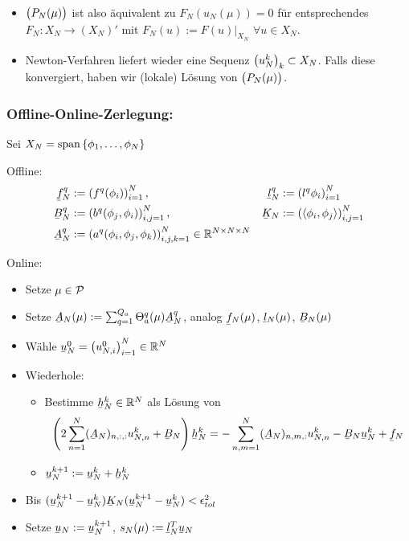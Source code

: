 \begin{bem} \beginwithlistbem
	\begin{itemize}
		\item $\big(P_N(\mu)\big)$ ist also äquivalent zu $F_N(u_N(\mu))=0$ für entsprechendes $F_N : X_N \to (X_N)'$ mit $F_N(u):=F(u)|_{X_N}$ $\forall u \in X_N$.
		\item Newton-Verfahren liefert wieder eine Sequenz $\left(u_N^k\right)_k \subset X_N$.
			Falls diese konvergiert, haben wir (lokale) Lösung von $\big(P_N(\mu)\big)$.
	\end{itemize}
\end{bem}

\subsubsection*{Offline-Online-Zerlegung:}
Sei $X_N = \spn\set{\phi_1,\ldots,\phi_N}$

Offline:
\begin{align*}
	\ubar f_N^q &:= \seq{f^q(\phi_i)}_{i=1}^N, & \ubar l_N^q &:= \seq{l^q{\phi_i}}_{i=1}^N\\
	\ubar B_N^q &:= \seq{b^q(\phi_j,\phi_i)}_{i,j=1}^N, & \ubar K_N &:= \seq{\dotp{\phi_i}{\phi_j}}_{i,j=1}^N\\
	\ubar A_N^q &:= \seq{a^q(\phi_i,\phi_j,\phi_k)}_{i,j,k=1}^N \in \R^{N \times N \times N}
\end{align*}

Online:
\begin{itemize}
	\item Setze $\mu \in \mathcal{P}$
	\item Setze $\ubar A_N(\mu) := \sum_{q=1}^{Q_a} \Theta_a^q(\mu) \ubar A_N^q$, analog $\ubar f_N(\mu)$, $\ubar l_N(\mu)$, $\ubar B_N(\mu)$
	\item Wähle $\ubar u_N^0 = \seq{u_{N,i}^0}_{i=1}^N \in \R^N$
	\item Wiederhole:
		\begin{itemize}
			\item Bestimme $\ubar h_N^k \in \R^N$ als Lösung von
				\[
					\left( 2\sum_{n=1}^N (\ubar A_N)_{n,:,:} u_{N,n}^k + \ubar B_N \right) \ubar h_N^k = -\sum_{n,m=1}^N (\ubar A_N)_{n,m,:} u_{N,n}^k - \ubar B_N \ubar u_N^k + \ubar f_N
				\]
			\item $\ubar u_N^{k+1} := \ubar u_N^k + \ubar h_N^k$
		\end{itemize}
	\item Bis $(\ubar u_N^{k+1} - \ubar u_N^k) \ubar K_N (\ubar u_N^{k+1} - \ubar u_N^k) < \epsilon_{tol}^2$
	\item Setze $\ubar u_N := \ubar u_N^{k+1}$, $s_N(\mu) := \ubar l_N^T \ubar u_N$
\end{itemize}


